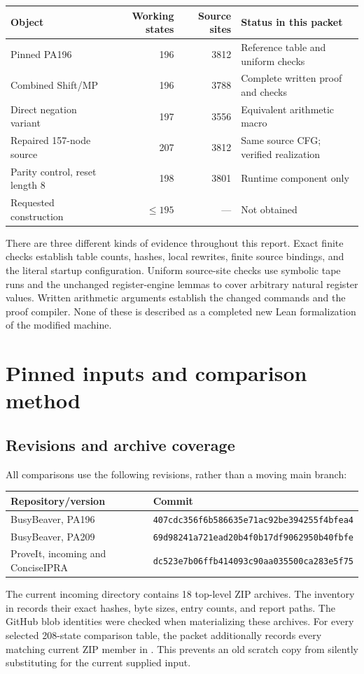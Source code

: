 \documentclass[11pt,a4paper]{article}
\begin{document}
\begin{center}\small
\begin{tabular}{@{}lrrl@{}}
\toprule
Object & Working states & Source sites & Status in this packet\\
\midrule
Pinned PA196 &196&3812&Reference table and uniform checks\\
Combined Shift/MP &196&3788&Complete written proof and checks\\
Direct negation variant &197&3556&Equivalent arithmetic macro\\
Repaired 157-node source &207&3812&Same source CFG; verified realization\\
Parity control, reset length 8 &198&3801&Runtime component only\\
Requested construction &$\le195$&---&Not obtained\\
\bottomrule
\end{tabular}
\end{center}

There are three different kinds of evidence throughout this report. Exact
finite checks establish table counts, hashes, local rewrites, finite source
bindings, and the literal startup configuration. Uniform source-site checks
use symbolic tape runs and the unchanged register-engine lemmas to cover
arbitrary natural register values. Written arithmetic arguments establish
the changed commands and the proof compiler. None of these is described
as a completed new Lean formalization of the modified machine.

\section{Pinned inputs and comparison method}
\subsection{Revisions and archive coverage}
All comparisons use the following revisions, rather than a moving main
branch:
\begin{center}\small
\begin{tabular}{@{}ll@{}}
\toprule
Repository/version & Commit\\
\midrule
BusyBeaver, PA196 &\texttt{407cdc356f6b586635e71ac92be394255f4bfea4}\\
BusyBeaver, PA209 &\texttt{69d98241a721ead20b4f0b17df9062950b40fbfe}\\
ProveIt, incoming and ConciseIPRA &\texttt{dc523e7b06ffb414093c90aa035500ca283e5f75}\\
\bottomrule
\end{tabular}
\end{center}
The current incoming directory contains 18 top-level ZIP archives. The
inventory in  records their
exact hashes, byte sizes, entry counts, and report paths. The GitHub blob
identities were checked when materializing these archives. For every
selected 208-state comparison table, the packet additionally records every
matching current ZIP member in
. This prevents an old
scratch copy from silently substituting for the current supplied input.
\end{document}
